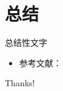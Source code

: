 \section{总结}

\begin{frame}
    \begin{center}
        {\Huge\calligra 总结性文字}
    \end{center}
\end{frame}

\begin{frame}[allowframebreaks]
\begin{itemize}
    \item 参考文献：
\end{itemize}
    \scriptsize
    
\end{frame}

\begin{frame}
    \begin{center}
        {\Huge\calligra Thanks!}
    \end{center}
\end{frame}